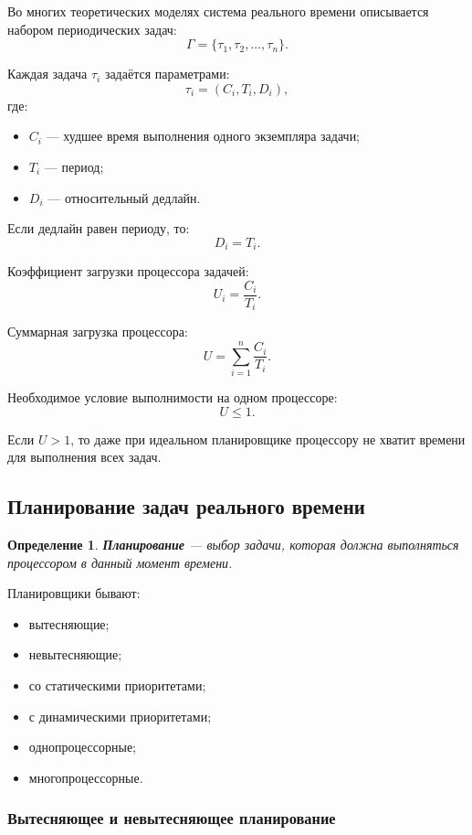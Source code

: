 \documentclass[12pt,a4paper]{article}
\newtheorem{definition}{Определение}
\begin{document}
Во многих теоретических моделях система реального времени описывается набором периодических задач:
\[
    \Gamma = \{\tau_1, \tau_2, \dots, \tau_n\}.
\]

Каждая задача $\tau_i$ задаётся параметрами:
\[
    \tau_i = (C_i, T_i, D_i),
\]
где:
\begin{itemize}
    \item $C_i$ --- худшее время выполнения одного экземпляра задачи;
    \item $T_i$ --- период;
    \item $D_i$ --- относительный дедлайн.
\end{itemize}

Если дедлайн равен периоду, то:
\[
    D_i = T_i.
\]

Коэффициент загрузки процессора задачей:
\[
    U_i = \frac{C_i}{T_i}.
\]

Суммарная загрузка процессора:
\[
    U = \sum_{i=1}^{n} \frac{C_i}{T_i}.
\]

Необходимое условие выполнимости на одном процессоре:
\[
    U \leq 1.
\]

Если $U > 1$, то даже при идеальном планировщике процессору не хватит времени для выполнения всех задач.

\subsection{Планирование задач реального времени}

\begin{definition}
\textbf{Планирование} --- выбор задачи, которая должна выполняться процессором в данный момент времени.
\end{definition}

Планировщики бывают:
\begin{itemize}
    \item вытесняющие;
    \item невытесняющие;
    \item со статическими приоритетами;
    \item с динамическими приоритетами;
    \item однопроцессорные;
    \item многопроцессорные.
\end{itemize}

\subsubsection{Вытесняющее и невытесняющее планирование}
\end{document}
